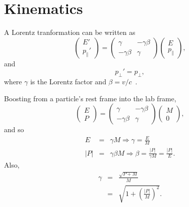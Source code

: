\chapter{Kinematics}
\label{app:kinematics}
A Lorentz tranformation can be written as
\begin{equation}
\left(\begin{array}{c} E' \\ p_{\parallel}' \end{array} \right)
=
\left(
\begin{array}{cc}
\gamma & -\gamma\beta \\
-\gamma\beta & \gamma
\end{array}
\right)
\left (\begin{array}{c} E \\ p_{\parallel} \end{array}\right),
\end{equation}
and
\begin{equation}
p_{\perp}' = p_{\perp},
\end{equation}
where $\gamma$ is the Lorentz factor and $\beta=v/c$~\cite{pdg}.

Boosting from a particle's rest frame into the lab frame,
\begin{equation}
\left(\begin{array}{c} E \\ P \end{array} \right)
=
\left(
\begin{array}{cc}
\gamma & -\gamma\beta \\
-\gamma\beta & \gamma
\end{array}
\right)
\left (\begin{array}{c} M \\ 0 \end{array}\right),
\end{equation}
and so
\begin{eqnarray*}
E &=& \gamma M  \Longrightarrow \gamma = \frac{E}{M} \\
|P| &=& \gamma\beta M \Longrightarrow \beta = \frac{|P|}{\gamma M} = \frac{|P|}{E}.
\end{eqnarray*}
Also,
\begin{eqnarray*}
\gamma &=& \frac{\sqrt{P + M}}{M} \\
&=& \sqrt{1 +\left(\frac{|P|}{M}\right)^2}.
\end{eqnarray*}
